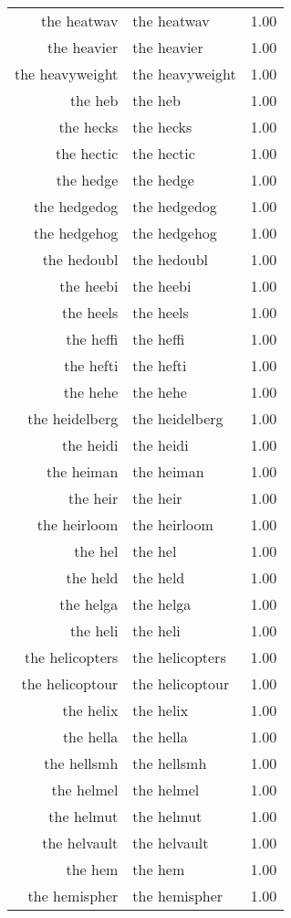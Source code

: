 \begin{table}[ht]
\begin{tabular}{rlr}
  the heatwav & the heatwav & 1.00 \\ 
  the heavier & the heavier & 1.00 \\ 
  the heavyweight & the heavyweight & 1.00 \\ 
  the heb & the heb & 1.00 \\ 
  the hecks & the hecks & 1.00 \\ 
  the hectic & the hectic & 1.00 \\ 
  the hedge & the hedge & 1.00 \\ 
  the hedgedog & the hedgedog & 1.00 \\ 
  the hedgehog & the hedgehog & 1.00 \\ 
  the hedoubl & the hedoubl & 1.00 \\ 
  the heebi & the heebi & 1.00 \\ 
  the heels & the heels & 1.00 \\ 
  the heffi & the heffi & 1.00 \\ 
  the hefti & the hefti & 1.00 \\ 
  the hehe & the hehe & 1.00 \\ 
  the heidelberg & the heidelberg & 1.00 \\ 
  the heidi & the heidi & 1.00 \\ 
  the heiman & the heiman & 1.00 \\ 
  the heir & the heir & 1.00 \\ 
  the heirloom & the heirloom & 1.00 \\ 
  the hel & the hel & 1.00 \\ 
  the held & the held & 1.00 \\ 
  the helga & the helga & 1.00 \\ 
  the heli & the heli & 1.00 \\ 
  the helicopters & the helicopters & 1.00 \\ 
  the helicoptour & the helicoptour & 1.00 \\ 
  the helix & the helix & 1.00 \\ 
  the hella & the hella & 1.00 \\ 
  the hellsmh & the hellsmh & 1.00 \\ 
  the helmel & the helmel & 1.00 \\ 
  the helmut & the helmut & 1.00 \\ 
  the helvault & the helvault & 1.00 \\ 
  the hem & the hem & 1.00 \\ 
  the hemispher & the hemispher & 1.00 \\ 

\end{tabular}
\end{table}
